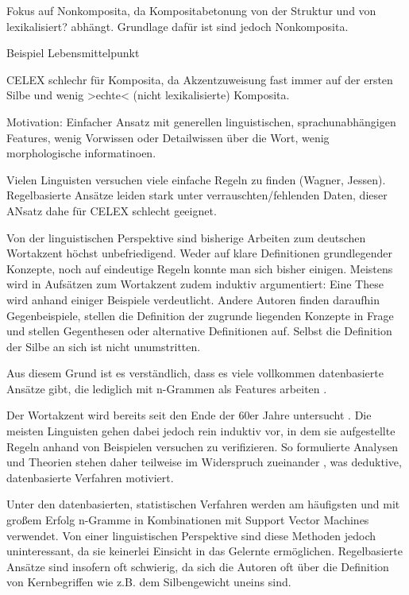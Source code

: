 Fokus auf Nonkomposita, da Kompositabetonung von der Struktur und von lexikalisiert? abhängt. Grundlage dafür ist sind jedoch Nonkomposita.

Beispiel Lebensmittelpunkt \cite[S.~62]{Demberg2006}

CELEX schlechr für Komposita, da Akzentzuweisung fast immer auf der ersten Silbe und wenig >echte< (nicht lexikalisierte) Komposita. \cite[S.~62]{Demberg2006}

Motivation: Einfacher Ansatz mit generellen linguistischen, sprachunabhängigen Features, wenig Vorwissen oder Detailwissen über die Wort, wenig morphologische informatinoen.

Vielen Linguisten versuchen viele einfache Regeln zu finden (Wagner, Jessen). Regelbasierte Ansätze leiden stark unter verrauschten/fehlenden  Daten, dieser ANsatz dahe für CELEX schlecht geeignet. \cite[S.~68]{Demberg2006}




Von der linguistischen Perspektive sind bisherige Arbeiten zum deutschen Wortakzent höchst unbefriedigend. Weder auf klare Definitionen grundlegender Konzepte, noch auf eindeutige Regeln konnte man sich bisher einigen. Meistens wird in Aufsätzen zum Wortakzent zudem induktiv argumentiert: Eine These wird anhand einiger Beispiele verdeutlicht. Andere Autoren finden daraufhin Gegenbeispiele, stellen die Definition der zugrunde liegenden Konzepte in Frage und stellen Gegenthesen oder alternative Definitionen auf. Selbst die Definition der Silbe an sich ist nicht unumstritten.

Aus diesem Grund ist es verständlich, dass es viele vollkommen datenbasierte Ansätze gibt, die lediglich mit n-Grammen als Features arbeiten .

Der Wortakzent wird bereits seit den Ende der 60er Jahre untersucht \cite{CHOMSKY&HALLE1968}. Die meisten Linguisten gehen dabei jedoch rein induktiv vor, in dem sie aufgestellte Regeln anhand von Beispielen versuchen zu verifizieren. So formulierte Analysen und Theorien stehen daher teilweise im Widerspruch zueinander \cite{Fery1998}, was deduktive, datenbasierte Verfahren motiviert.

Unter den datenbasierten, statistischen Verfahren werden am häufigsten und mit großem Erfolg n-Gramme in Kombinationen mit Support Vector Machines verwendet. Von einer linguistischen Perspektive sind diese Methoden jedoch uninteressant, da sie keinerlei Einsicht in das Gelernte ermöglichen.
Regelbasierte Ansätze sind insofern oft schwierig, da sich die Autoren oft über die Definition von Kernbegriffen wie z.B. dem Silbengewicht uneins sind. %
